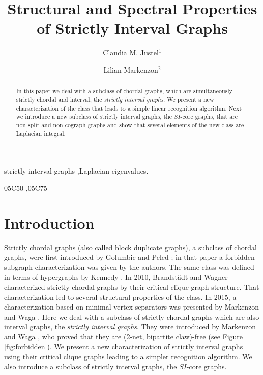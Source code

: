 \documentclass[preprint,12pt]{elsarticle}
\begin{document}
\begin{frontmatter}

\title{Structural and Spectral Properties of Strictly Interval Graphs}

\author{Claudia M. Justel$^{1}$} \author{Lilian Markenzon$^{2}$}

\address{$^{1}$ PGSC - Departamento de Engenharia de Computa\c c\~ao, Instituto Militar de Engenharia, Rio de Janeiro, Brazil.
}
\address{$^{2}$ PPGI - Universidade Federal do Rio de Janeiro, Rio de Janeiro, Brazil.
}

\begin{abstract}
{In this paper we deal with a subclass of chordal graphs, which are simultaneously strictly chordal and interval, the \textit{strictly interval graphs}.
We present a new characterization of the class that
leads to a simple linear recognition algorithm.
Next we  introduce a new subclass of strictly interval graphs, the $SI$-core graphs, 
that are  non-split and non-cograph graphs and show that several elements of the new class are Laplacian integral.}
\end{abstract}

\begin{keyword}
strictly interval graphs \sep Laplacian eigenvalues.

\MSC 05C50 \sep 05C75

\end{keyword}

\end{frontmatter}


\section{Introduction}\label{intro}

Strictly chordal graphs (also called block duplicate graphs), a subclass of chordal graphs, were first introduced by Golumbic and Peled \cite{GP02}; in that paper a forbidden subgraph characterization was given by the authors. 
The same class  was defined in terms of hypergraphs by Kennedy \cite{K05}. 
In 2010, Brandst\"adt and Wagner \cite{BW10} characterized strictly chordal graphs by their critical clique graph structure.    
That characterization led to several structural properties of the class.
In 2015, a characterization based on minimal
vertex separators was presented by Markenzon and Waga \cite{MW15}.
Here we deal with a subclass of strictly chordal graphs 
which are also interval graphs,
the \textit{strictly interval graphs}.
They were introduced by Markenzon and Waga \cite{MW16},
who proved that they are (2-net, bipartite claw)-free (see Figure \ref{fig:forbidden}).
We present a new characterization of  strictly interval graphs using their critical clique graphs 
leading to a simpler recognition algorithm.
We  also introduce a subclass of strictly interval graphs, the  $SI$-core graphs.
\end{document}
